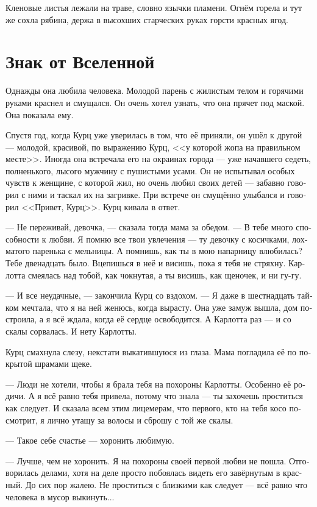 \documentclass[a4paper,12pt,fleqn]{book}\usepackage{polyglossia}\setdefaultlanguage[babelshorthands=true]{russian}\setotherlanguage{english}\defaultfontfeatures{Ligatures=TeX,Mapping=tex-text}\usepackage{xcolor}\newcommand{\ml}[3]{#2}
\begin{document}
Кленовые листья лежали на траве, словно язычки пламени.
Огнём горела и тут же сохла рябина, держа в высохших старческих руках горсти красных ягод.

\section{Знак от Вселенной}

Однажды она любила человека.
Молодой парень с жилистым телом и горячими руками краснел и смущался.
Он очень хотел узнать, что она прячет под маской.
Она показала ему.

Спустя год, когда Курц уже уверилась в том, что её приняли, он ушёл к другой --- молодой, красивой, по выражению Курц, <<у которой жопа на правильном месте>>.
Иногда она встречала его на окраинах города --- уже начавшего седеть, полненького, лысого мужчину с пушистыми усами.
Он не испытывал особых чувств к женщине, с которой жил, но очень любил своих детей --- забавно говорил с ними и таскал их на загривке.
При встрече он смущённо улыбался и говорил <<Привет, Курц>>.
Курц кивала в ответ.

--- Не переживай, девочка, --- сказала тогда мама за обедом.
--- В тебе много способности к любви.
Я помню все твои увлечения --- ту девочку с косичками, лохматого паренька с мельницы.
А помнишь, как ты в мою напарницу влюбилась?
Тебе двенадцать было.
Вцепишься в неё и висишь, пока я тебя не стряхну.
Карлотта смеялась над тобой, как чокнутая, а ты висишь, как щеночек, и ни гу-гу.

--- И все неудачные, --- закончила Курц со вздохом.
--- Я даже в шестнадцать тайком мечтала, что я на ней женюсь, когда вырасту.
Она уже замуж вышла, дом построила, а я всё ждала, когда её сердце освободится.
А Карлотта раз --- и со скалы сорвалась.
И нету Карлотты.

Курц смахнула слезу, некстати выкатившуюся из глаза.
Мама погладила её по покрытой шрамами щеке.

--- Люди не хотели, чтобы я брала тебя на похороны Карлотты.
Особенно её родичи.
А я всё равно тебя привела, потому что знала --- ты захочешь проститься как следует.
И сказала всем этим лицемерам, что первого, кто на тебя косо посмотрит, я лично утащу за волосы и сброшу с той же скалы.

--- Такое себе счастье --- хоронить любимую.

--- Лучше, чем не хоронить.
Я на похороны своей первой любви не пошла.
Отговорилась делами, хотя на деле просто побоялась видеть его завёрнутым в красный.
До сих пор жалею.
Не проститься с близкими как следует --- всё равно что человека в мусор выкинуть...
\end{document}
